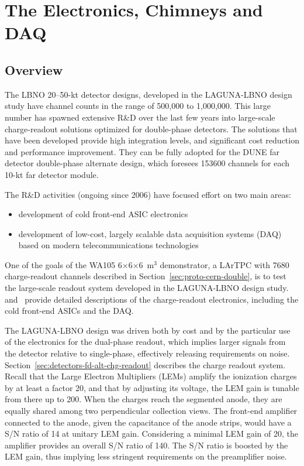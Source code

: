 \section{The Electronics, Chimneys and DAQ}
\label{sec:detectors-fd-alt-elec}

\subsection{Overview}
\label{sec:fd-alt-elec-ovvw}

The LBNO 20--50-kt detector designs, developed in the LAGUNA-LBNO
design study have channel counts in the range of 500,000 to 1,000,000.
This large number has spawned extensive R\&D over the last few years
into large-scale charge-readout solutions optimized for double-phase detectors.  
The solutions that have been developed provide high integration levels, and significant cost
reduction and performance improvement. They can be fully adopted for
the DUNE far detector double-phase alternate design, which  foresees
153600 channels for each 10-kt far detector module.

The R\&D activities (ongoing since 2006) have focused effort on two
main areas:
\begin {itemize} 
\item{development of cold front-end ASIC electronics}
\item{development of low-cost, largely scalable data 
acquisition systems (DAQ) based on modern telecommunications technologies}
\end{itemize}

One of the goals of the WA105 6$\times$6$\times$6~m$^3$ demonstrator,
a LArTPC with \num{7680} charge-readout channels described in Section~\ref{sec:proto-cern-double}, is to test the
large-scale readout system developed in the LAGUNA-LBNO design
study. \anxdualtdr{} and~\cite{WA105_SREP} provide detailed descriptions
of the charge-readout electronics, including the cold front-end ASICs
and the DAQ.

The LAGUNA-LBNO design was driven both by cost and by the particular use of the
electronics for the dual-phase readout, which implies larger signals
from the detector relative to single-phase, effectively releasing requirements on noise. 
Section~\ref{sec:detectors-fd-alt-chg-readout} describes
the charge readout system.  Recall that the Large Electron Multipliers (LEMs) 
amplify the ionization charges by at least a factor 20, and that by 
adjusting its voltage, the LEM gain is tunable from there
up to 200. When the charges reach the segmented anode, they are
equally shared among two perpendicular collection views.
The front-end amplifier connected to the anode, given the capacitance
of the anode strips, would have a S/N ratio of 14 at unitary LEM gain. 
Considering a minimal LEM gain of 20, the amplifier provides an
overall S/N ratio of 140. The S/N ratio is boosted by the LEM gain, thus 
implying less stringent requirements on the preamplifier noise.

